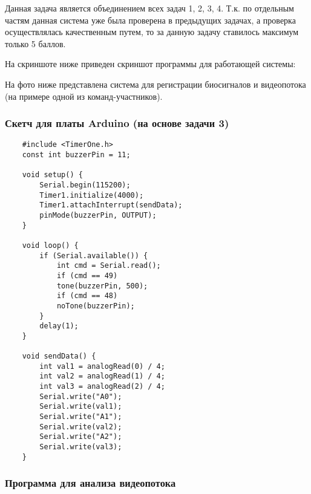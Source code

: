 \solutionSection

Данная задача является объединением всех задач 1, 2, 3, 4. Т.к. по отдельным частям данная система уже была проверена в предыдущих задачах, а проверка осуществлялась качественным путем, то за данную задачу ставилось максимум только 5 баллов. 

На скриншоте ниже приведен скриншот программы для работающей системы:


На фото ниже представлена система для регистрации биосигналов и видеопотока (на примере одной из команд-участников).


\subsubsection*{Скетч для платы Arduino (на основе задачи 3)}

\begin{verbatim}
    #include <TimerOne.h>
    const int buzzerPin = 11;

    void setup() {
        Serial.begin(115200);
        Timer1.initialize(4000);
        Timer1.attachInterrupt(sendData);
        pinMode(buzzerPin, OUTPUT);
    }

    void loop() {
        if (Serial.available()) {
            int cmd = Serial.read();
            if (cmd == 49)
            tone(buzzerPin, 500);
            if (cmd == 48)
            noTone(buzzerPin);
        }
        delay(1);
    }

    void sendData() {
        int val1 = analogRead(0) / 4;
        int val2 = analogRead(1) / 4;
        int val3 = analogRead(2) / 4;
        Serial.write("A0");
        Serial.write(val1);
        Serial.write("A1");
        Serial.write(val2);
        Serial.write("A2");
        Serial.write(val3);
    }
\end{verbatim}

\subsubsection*{Программа для анализа видеопотока}

